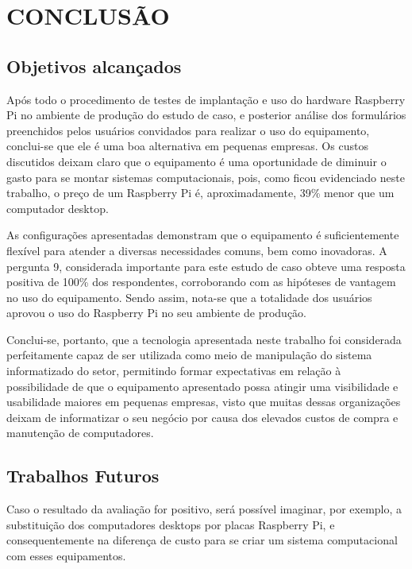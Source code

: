 \chapter{CONCLUSÃO}

\section{Objetivos alcançados}

Após todo o procedimento de testes de implantação e uso do hardware Raspberry Pi no ambiente de produção do estudo de caso, e posterior análise dos formulários preenchidos pelos usuários convidados para realizar o uso do equipamento, conclui-se que ele é uma boa alternativa em pequenas empresas.
Os custos discutidos deixam claro que o equipamento é uma oportunidade de diminuir o gasto para se montar sistemas computacionais, pois, como ficou evidenciado neste trabalho, o preço de um Raspberry Pi é, aproximadamente, 39\% menor que um computador desktop.

As configurações apresentadas demonstram que o equipamento é suficientemente flexível para atender a diversas necessidades comuns, bem como inovadoras.
A pergunta 9, considerada importante para este estudo de caso obteve uma resposta positiva de 100\% dos respondentes, corroborando com as hipóteses de vantagem no uso do equipamento. Sendo assim, nota-se que a totalidade dos usuários aprovou o uso do Raspberry Pi no seu ambiente de produção.

Conclui-se, portanto, que a tecnologia apresentada neste trabalho foi considerada perfeitamente capaz de ser utilizada como meio de manipulação do sistema informatizado do setor, permitindo formar expectativas em relação à possibilidade de que o equipamento apresentado possa atingir uma visibilidade e usabilidade maiores em pequenas empresas, visto que muitas dessas organizações deixam de informatizar o seu negócio por causa dos elevados custos de compra e manutenção de computadores.

\section{Trabalhos Futuros}

Caso o resultado da avaliação for positivo, será possível imaginar, por exemplo, a substituição dos computadores desktops por placas Raspberry Pi, e consequentemente na diferença de custo para se criar um sistema computacional com esses equipamentos.